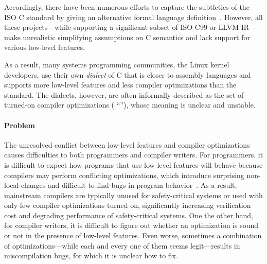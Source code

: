 Accordingly, there have been numerous efforts to capture the subtleties of the ISO C standard by
giving an alternative formal language
definition~\cite{leroy:compcert,vellvm:popl12,ellison2012executable,norrish1998c,krebbers}.  However, all
these projects---while supporting a significant subset of ISO C99 or LLVM IR---make unrealistic
simplifying assumptions on C semantics and lack support for various low-level features.


As a result, many systems programming communities, \eg{} the Linux kernel developers, use their own
\emph{dialect} of C that is closer to assembly languages and supports more low-level features and
less compiler optimizations than the standard.  The dialects, however, are often informally
described as the set of turned-on compiler optimizations (\eg{} ``''), whose meaning
is unclear and unstable.


\paragraph{Problem}


The unresolved conflict between low-level features and compiler optimizations causes difficulties to
both programmers and compiler writers.  For programmers, it is difficult to expect how programs that
use low-level features will behave because compilers may perform conflicting optimizations, which
introduce surprising non-local changes and difficult-to-find bugs in program
behavior~\cite{wang2013towards,yang2011finding}.  As a result, mainstream compilers are typically
unused for safety-critical systems or used with only few compiler optimizations turned on,
significantly increasing verification cost and degrading performance of safety-critical systems.
One the other hand, for compiler writers, it is difficult to figure out whether an optimization is
sound or not in the presence of low-level features.  Even worse, sometimes a combination of
optimizations---while each and every one of them seems legit---results in miscompilation bugs, for
which it is unclear how to fix.



